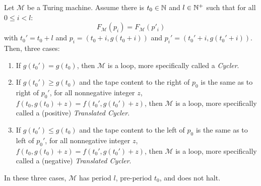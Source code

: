 \begin{theorem}[Loops]\label{th:loops:theory} Let $\mathcal{M}$ be a Turing machine.
    Assume there is $ t_0 \in \mathbb{N}$ and $l \in \mathbb{N}^+$ such that
    for all $0 \leq i < l$: $$F_\mathcal{M}(p_i)   = F_\mathcal{M}(p'_i)$$
    with $t_0' = t_0+l$ and $p_i = (t_0+i, g(t_0+i))$ and $p_i' = (t_0'+i, g(t_0'+i))$. Then, three cases:
    \begin{enumerate}
        \item If $g(t_0') = g(t_0)$, then $\mathcal{M}$ is a loop, more specifically called a \textit{Cycler}.\label{th:case1}
        \item If $g(t_0') \geq g(t_0)$ and the tape content to the right of $p_0$ is the same as to right of $p_0'$, \ie for all nonnegative integer $z$, $f(t_0,g(t_0)+z) = f(t_0',g(t_0')+z)$, then $\mathcal{M}$ is a loop, more specifically called a (positive) \textit{Translated Cycler}.\label{th:case2}
        \item If $g(t_0') \leq g(t_0)$ and the tape content to the left of $p_0$ is the same as to left of $p_0'$, \ie for all nonnegative integer $z$, $f(t_0,g(t_0)+z) = f(t_0',g(t_0')+z)$, then $\mathcal{M}$ is a loop, more specifically called a (negative) \textit{Translated Cycler}.\label{th:case3}
    \end{enumerate}
    In these three cases, $\mathcal{M}$ has period $l$, pre-period $t_0$, and does not halt.
\end{theorem}

